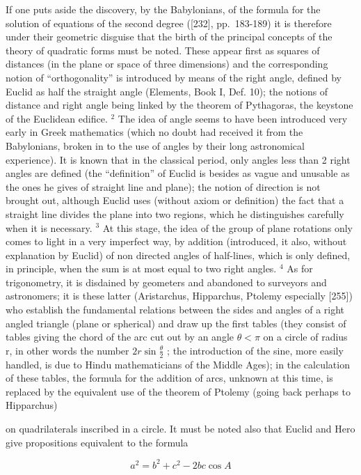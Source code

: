 If one puts aside the discovery, by the Babylonians, of the formula for the solution of equations of the second degree ({[}232{]}, pp.~183-189) it is therefore under their geometric disguise that the birth of the principal concepts of the theory of quadratic forms must be noted. These appear first as squares of distances (in the plane or space of three dimensions) and the corresponding notion of ``orthogonality'' is introduced by means of the right angle, defined by Euclid as half the straight angle (Elements, Book I, Def. 10); the notions of distance and right angle being linked by the theorem of Pythagoras, the keystone of the Euclidean edifice. \(^{2}\) The idea of angle seems to have been introduced very early in Greek mathematics (which no doubt had received it from the Babylonians, broken in to the use of angles by their long astronomical experience). It is known that in the classical period, only angles less than 2 right angles are defined (the ``definition'' of Euclid is besides as vague and unusable as the ones he gives of straight line and plane); the notion of direction is not brought out, although Euclid uses (without axiom or definition) the fact that a straight line divides the plane into two regions, which he distinguishes carefully when it is necessary. \(^{3}\) At this stage, the idea of the group of plane rotations only comes to light in a very imperfect way, by addition (introduced, it also, without explanation by Euclid) of non directed angles of half-lines, which is only defined, in principle, when the sum is at most equal to two right angles. \(^{4}\) As for trigonometry, it is disdained by geometers and abandoned to surveyors and astronomers; it is these latter (Aristarchus, Hipparchus, Ptolemy especially {[}255{]}) who establish the fundamental relations between the sides and angles of a right angled triangle (plane or spherical) and draw up the first tables (they consist of tables giving the chord of the arc cut out by an angle \(\theta < \pi\) on a circle of radius r, in other words the number \(2r \sin \frac{\theta}{2}\) ; the introduction of the sine, more easily handled, is due to Hindu mathematicians of the Middle Ages); in the calculation of these tables, the formula for the addition of arcs, unknown at this time, is replaced by the equivalent use of the theorem of Ptolemy (going back perhaps to Hipparchus)

on quadrilaterals inscribed in a circle. It must be noted also that Euclid and Hero give propositions equivalent to the formula

\[
a ^ {2} = b ^ {2} + c ^ {2} - 2 b c \cos A
\]

